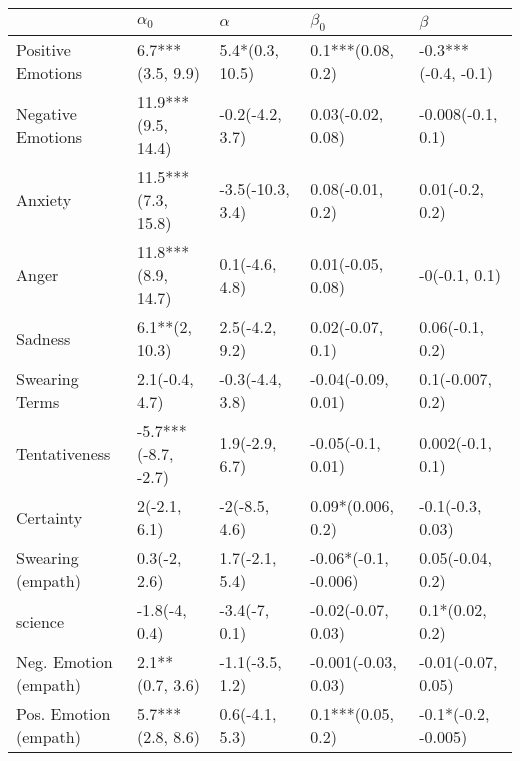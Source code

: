 \begin{tabular}{lllll}
\toprule
{} &           $\alpha_0$ &          $\alpha$ &             $\beta_0$ &              $\beta$ \\
\midrule
Positive Emotions     &     6.7***(3.5, 9.9) &   5.4*(0.3, 10.5) &     0.1***(0.08, 0.2) &  -0.3***(-0.4, -0.1) \\
Negative Emotions     &   11.9***(9.5, 14.4) &   -0.2(-4.2, 3.7) &     0.03(-0.02, 0.08) &    -0.008(-0.1, 0.1) \\
Anxiety               &   11.5***(7.3, 15.8) &  -3.5(-10.3, 3.4) &      0.08(-0.01, 0.2) &      0.01(-0.2, 0.2) \\
Anger                 &   11.8***(8.9, 14.7) &    0.1(-4.6, 4.8) &     0.01(-0.05, 0.08) &        -0(-0.1, 0.1) \\
Sadness               &       6.1**(2, 10.3) &    2.5(-4.2, 9.2) &      0.02(-0.07, 0.1) &      0.06(-0.1, 0.2) \\
Swearing Terms        &       2.1(-0.4, 4.7) &   -0.3(-4.4, 3.8) &    -0.04(-0.09, 0.01) &     0.1(-0.007, 0.2) \\
Tentativeness         &  -5.7***(-8.7, -2.7) &    1.9(-2.9, 6.7) &     -0.05(-0.1, 0.01) &     0.002(-0.1, 0.1) \\
Certainty             &         2(-2.1, 6.1) &     -2(-8.5, 4.6) &     0.09*(0.006, 0.2) &     -0.1(-0.3, 0.03) \\
Swearing (empath)     &         0.3(-2, 2.6) &    1.7(-2.1, 5.4) &  -0.06*(-0.1, -0.006) &     0.05(-0.04, 0.2) \\
science               &        -1.8(-4, 0.4) &     -3.4(-7, 0.1) &    -0.02(-0.07, 0.03) &      0.1*(0.02, 0.2) \\
Neg. Emotion (empath) &      2.1**(0.7, 3.6) &   -1.1(-3.5, 1.2) &   -0.001(-0.03, 0.03) &   -0.01(-0.07, 0.05) \\
Pos. Emotion (empath) &     5.7***(2.8, 8.6) &    0.6(-4.1, 5.3) &     0.1***(0.05, 0.2) &  -0.1*(-0.2, -0.005) \\
\bottomrule
\end{tabular}
